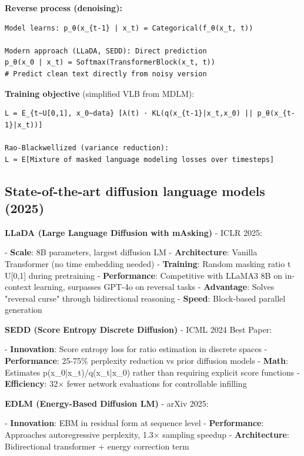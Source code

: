\documentclass[11pt]{article}
\begin{document}
\textbf{Reverse process (denoising):}

\begin{verbatim}
Model learns: p_θ(x_{t-1} | x_t) = Categorical(f_θ(x_t, t))

Modern approach (LLaDA, SEDD): Direct prediction
p_θ(x_0 | x_t) = Softmax(TransformerBlock(x_t, t))
# Predict clean text directly from noisy version
\end{verbatim}

\textbf{Training objective} (simplified VLB from MDLM):

\begin{verbatim}
L = E_{t~U[0,1], x_0~data} [λ(t) · KL(q(x_{t-1}|x_t,x_0) || p_θ(x_{t-1}|x_t))]

Rao-Blackwellized (variance reduction):
L ≈ E[Mixture of masked language modeling losses over timesteps]
\end{verbatim}

\subsection{State-of-the-art diffusion language models (2025)}

\textbf{LLaDA (Large Language Diffusion with mAsking)} - ICLR 2025:

- \textbf{Scale}: 8B parameters, largest diffusion LM
- \textbf{Architecture}: Vanilla Transformer (no time embedding needed)
- \textbf{Training}: Random masking ratio t ~ U[0,1] during pretraining
- \textbf{Performance}: Competitive with LLaMA3 8B on in-context learning, surpasses GPT-4o on reversal tasks
- \textbf{Advantage}: Solves "reversal curse" through bidirectional reasoning
- \textbf{Speed}: Block-based parallel generation

\textbf{SEDD (Score Entropy Discrete Diffusion)} - ICML 2024 Best Paper:

- \textbf{Innovation}: Score entropy loss for ratio estimation in discrete spaces
- \textbf{Performance}: 25-75\% perplexity reduction vs prior diffusion models
- \textbf{Math}: Estimates p(x_0|x_t)/q(x_t|x_0) rather than requiring explicit score functions
- \textbf{Efficiency}: 32\(\times\) fewer network evaluations for controllable infilling

\textbf{EDLM (Energy-Based Diffusion LM)} - arXiv 2025:

- \textbf{Innovation}: EBM in residual form at sequence level
- \textbf{Performance}: Approaches autoregressive perplexity, 1.3\(\times\) sampling speedup
- \textbf{Architecture}: Bidirectional transformer + energy correction term
\end{document}
